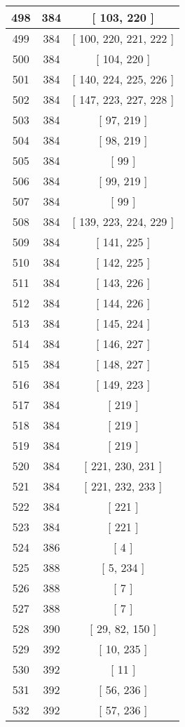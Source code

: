 \begin{center}
\begin{longtable}[H]{|| c c c ||}
\hline
498 & 384 & [ 103, 220 ] \\ 
\hline
499 & 384 & [ 100, 220, 221, 222 ] \\ 
\hline
500 & 384 & [ 104, 220 ] \\ 
\hline
501 & 384 & [ 140, 224, 225, 226 ] \\ 
\hline
502 & 384 & [ 147, 223, 227, 228 ] \\ 
\hline
503 & 384 & [ 97, 219 ] \\ 
\hline
504 & 384 & [ 98, 219 ] \\ 
\hline
505 & 384 & [ 99 ] \\ 
\hline
506 & 384 & [ 99, 219 ] \\ 
\hline
507 & 384 & [ 99 ] \\ 
\hline
508 & 384 & [ 139, 223, 224, 229 ] \\ 
\hline
509 & 384 & [ 141, 225 ] \\ 
\hline
510 & 384 & [ 142, 225 ] \\ 
\hline
511 & 384 & [ 143, 226 ] \\ 
\hline
512 & 384 & [ 144, 226 ] \\ 
\hline
513 & 384 & [ 145, 224 ] \\ 
\hline
514 & 384 & [ 146, 227 ] \\ 
\hline
515 & 384 & [ 148, 227 ] \\ 
\hline
516 & 384 & [ 149, 223 ] \\ 
\hline
517 & 384 & [ 219 ] \\ 
\hline
518 & 384 & [ 219 ] \\ 
\hline
519 & 384 & [ 219 ] \\ 
\hline
520 & 384 & [ 221, 230, 231 ] \\ 
\hline
521 & 384 & [ 221, 232, 233 ] \\ 
\hline
522 & 384 & [ 221 ] \\ 
\hline
523 & 384 & [ 221 ] \\ 
\hline
524 & 386 & [ 4 ] \\ 
\hline
525 & 388 & [ 5, 234 ] \\ 
\hline
526 & 388 & [ 7 ] \\ 
\hline
527 & 388 & [ 7 ] \\ 
\hline
528 & 390 & [ 29, 82, 150 ] \\ 
\hline
529 & 392 & [ 10, 235 ] \\ 
\hline
530 & 392 & [ 11 ] \\ 
\hline
531 & 392 & [ 56, 236 ] \\ 
\hline
532 & 392 & [ 57, 236 ] \\ 

\end{longtable}
\end{center}
